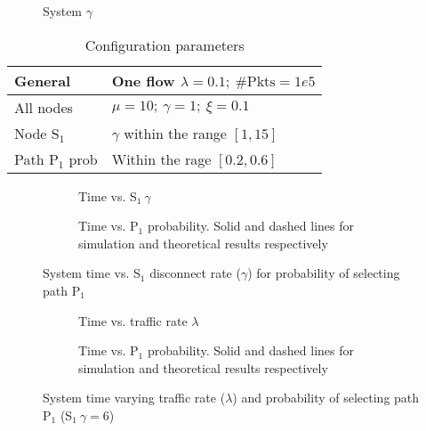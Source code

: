 \documentclass[]{report}
\begin{document}
\begin{figure}
	\centering
	
	\caption{System $\gamma$}
\end{figure}

\begin{table}
	\centering
	\caption{Configuration parameters\label{tab:conf}}
	\begin{tabular}{|l|l|}\hline\hline
		General & One flow  $\lambda=0.1;~\#\text{Pkts}=1e5$ \\\hline
		All nodes & $\mu= 10;~\gamma=1;~\xi=0.1$\\\hline
		Node S$_1$ &  $\gamma$ within the range $[1, 15]$\\\hline
		Path P$_1$ prob & Within the rage $[0.2, 0.6]$\\\hline\hline
	\end{tabular}
\end{table}

\begin{figure}
	\centering
	\begin{subfigure}[b]{\linewidth}
		\centering
		
		\caption{Time vs. S$_1~\gamma$ }
	\end{subfigure}
\begin{subfigure}[b]{\linewidth}
	\centering
	
	\caption{Time vs. P$_1$ probability. Solid and dashed lines for simulation and theoretical results respectively}
\end{subfigure}
	\caption{System time vs. S$_1$ disconnect rate ($\gamma$) for probability of selecting  path P$_1$ }
\end{figure}

\begin{figure}
	\centering
	\begin{subfigure}[b]{\linewidth}
		\centering
		
		\caption{Time vs. traffic rate $\lambda$}
	\end{subfigure}
	\begin{subfigure}[b]{\linewidth}
		\centering
		
		\caption{Time vs. P$_1$ probability. Solid and dashed lines for simulation and theoretical results respectively}		
	\end{subfigure}
	\caption{System time varying traffic rate ($\lambda$) and probability of selecting  path P$_1$ (S$_1~\gamma=6$) }
\end{figure}
	
\end{document}
